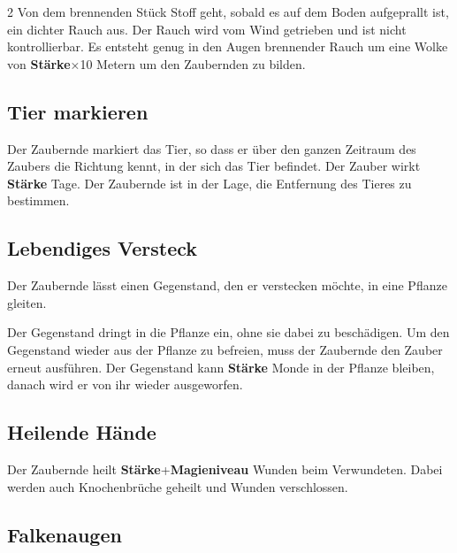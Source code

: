 \begin{multicols*}{2}
Von dem brennenden Stück Stoff geht, sobald es auf dem Boden aufgeprallt ist, ein dichter Rauch aus. Der Rauch wird vom Wind getrieben und ist nicht kontrollierbar. Es entsteht genug in den Augen brennender Rauch um eine Wolke von \textbf{Stärke}×10 Metern um den Zaubernden zu bilden.



\subsection{Tier markieren}

Der Zaubernde markiert das Tier, so dass er über den ganzen Zeitraum des Zaubers die Richtung kennt, in der sich das Tier befindet. Der Zauber wirkt \textbf{Stärke} Tage. Der Zaubernde ist in der Lage, die Entfernung des Tieres zu bestimmen.



\subsection{Lebendiges Versteck}

Der Zaubernde lässt einen Gegenstand, den er verstecken möchte, in eine Pflanze gleiten.

Der Gegenstand dringt in die Pflanze ein, ohne sie dabei zu beschädigen. Um den Gegenstand wieder aus der Pflanze zu befreien, muss der Zaubernde den Zauber erneut ausführen. Der Gegenstand kann \textbf{Stärke} Monde in der Pflanze bleiben, danach wird er von ihr wieder ausgeworfen.



\subsection{Heilende Hände}

Der Zaubernde heilt \textbf{Stärke}+\textbf{Magieniveau} Wunden beim Verwundeten. Dabei werden auch Knochenbrüche geheilt und Wunden verschlossen.



\subsection{Falkenaugen}


\end{multicols*}
